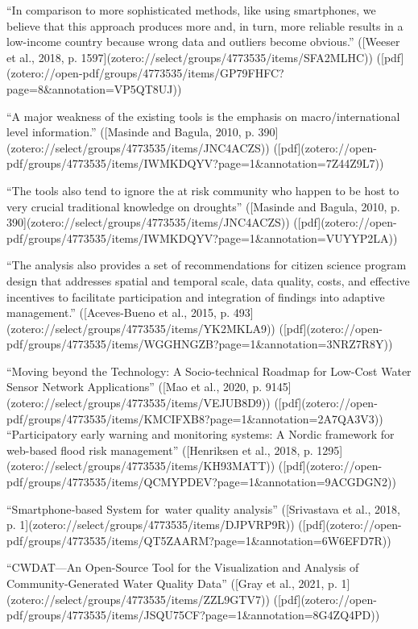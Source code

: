{“In comparison to more sophisticated methods, like using smartphones, we believe that this approach produces more and, in turn, more reliable results in a low-income country because wrong data and outliers become obvious.” ([Weeser et al., 2018, p. 1597](zotero://select/groups/4773535/items/SFA2MLHC)) ([pdf](zotero://open-pdf/groups/4773535/items/GP79FHFC?page=8&annotation=VP5QT8UJ))

“A major weakness of the existing tools is the emphasis on macro/international level information.” ([Masinde and Bagula, 2010, p. 390](zotero://select/groups/4773535/items/JNC4ACZS)) ([pdf](zotero://open-pdf/groups/4773535/items/IWMKDQYV?page=1&annotation=7Z44Z9L7))

“The tools also tend to ignore the at risk community who happen to be host to very crucial traditional knowledge on droughts” ([Masinde and Bagula, 2010, p. 390](zotero://select/groups/4773535/items/JNC4ACZS)) ([pdf](zotero://open-pdf/groups/4773535/items/IWMKDQYV?page=1&annotation=VUYYP2LA))

“The analysis also provides a set of recommendations for citizen science program design that addresses spatial and temporal scale, data quality, costs, and effective incentives to facilitate participation and integration of findings into adaptive management.” ([Aceves-Bueno et al., 2015, p. 493](zotero://select/groups/4773535/items/YK2MKLA9)) ([pdf](zotero://open-pdf/groups/4773535/items/WGGHNGZB?page=1&annotation=3NRZ7R8Y))

“Moving beyond the Technology: A Socio-technical Roadmap for Low-Cost Water Sensor Network Applications” ([Mao et al., 2020, p. 9145](zotero://select/groups/4773535/items/VEJUB8D9)) ([pdf](zotero://open-pdf/groups/4773535/items/KMCIFXB8?page=1&annotation=2A7QA3V3))
“Participatory early warning and monitoring systems: A Nordic framework for web-based flood risk management” ([Henriksen et al., 2018, p. 1295](zotero://select/groups/4773535/items/KH93MATT)) ([pdf](zotero://open-pdf/groups/4773535/items/QCMYPDEV?page=1&annotation=9ACGDGN2))

“Smartphone‑based System for water quality analysis” ([Srivastava et al., 2018, p. 1](zotero://select/groups/4773535/items/DJPVRP9R)) ([pdf](zotero://open-pdf/groups/4773535/items/QT5ZAARM?page=1&annotation=6W6EFD7R))

“CWDAT—An Open-Source Tool for the Visualization and Analysis of Community-Generated Water Quality Data” ([Gray et al., 2021, p. 1](zotero://select/groups/4773535/items/ZZL9GTV7)) ([pdf](zotero://open-pdf/groups/4773535/items/JSQU75CF?page=1&annotation=8G4ZQ4PD))

}
